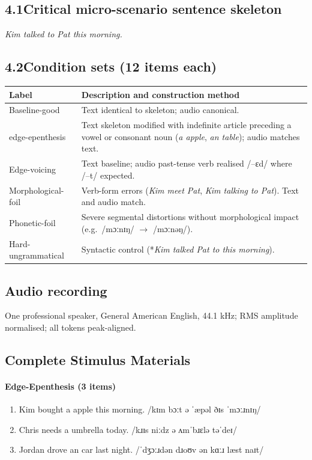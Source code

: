 \documentclass[12pt]{article}
\begin{document}
\subsection{4.1\quad Critical micro-scenario sentence skeleton}
\textit{Kim talked to Pat this morning.}

\subsection{4.2\quad Condition sets (12 items each)}
\begin{center}
\begin{tabular}{@{}lp{10cm}@{}}
\toprule
\textbf{Label} & \textbf{Description and construction method}\\
\midrule
Baseline-good & Text identical to skeleton; audio canonical.\\
edge-epenthesis & Text skeleton modified with indefinite article preceding a vowel or consonant noun (\textit{a apple}, \textit{an table}); audio matches text.\\
Edge-voicing & Text baseline; audio past-tense verb realised /–ɛd/ where /–t/ expected.\\
Morphological-foil & Verb-form errors (\textit{Kim \;meet \;Pat}, \textit{Kim talking to Pat}). Text and audio match.\\
Phonetic-foil & Severe segmental distortions without morphological impact (e.g.\ /mɔːnɪŋ/ $\rightarrow$ /mɔːnəŋ/).\\
Hard-ungrammatical & Syntactic control (*\textit{Kim talked Pat to this morning}).\\
\bottomrule
\end{tabular}
\end{center}

\subsection{Audio recording}
One professional speaker, General American English, 44.1 kHz; RMS amplitude normalised; all tokens peak-aligned.

\subsection{Complete Stimulus Materials}

\paragraph{Edge-Epenthesis (3 items)}
\begin{enumerate}
\item Kim bought a apple this morning. /kɪm bɔːt ə ˈæpəl ðɪs ˈmɔːɹnɪŋ/
\item Chris needs a umbrella today. /kɹɪs niːdz ə ʌmˈbɹɛlə təˈdeɪ/
\item Jordan drove an car last night. /ˈdʒɔːɹdən dɹoʊv ən kɑːɹ læst naɪt/
\end{enumerate}
\end{document}
